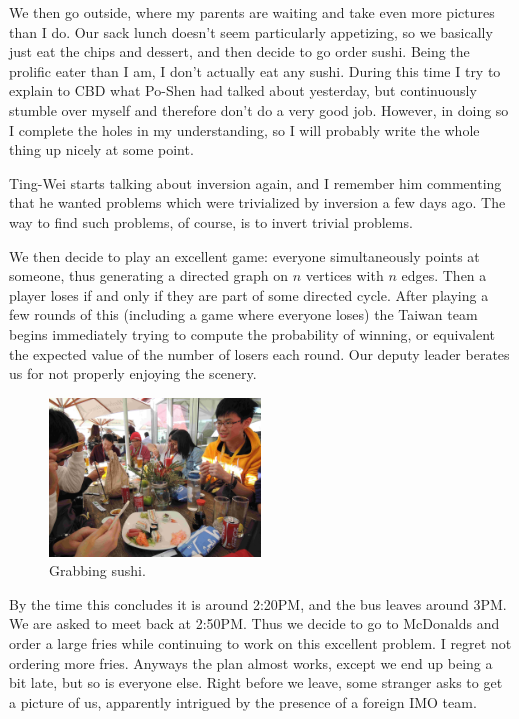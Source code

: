 \documentclass[11pt]{scrreprt}
\numberwithin{figure}{chapter}
\begin{document}
We then go outside, where my parents are waiting and take even more pictures than I do.
Our sack lunch doesn't seem particularly appetizing, so we basically just eat the chips and dessert,
and then decide to go order sushi. Being the prolific eater than I am, I don't actually eat any sushi.
During this time I try to explain to CBD what Po-Shen had talked about yesterday, but continuously
stumble over myself and therefore don't do a very good job.
However, in doing so I complete the holes in my understanding,
so I will probably write the whole thing up nicely at some point.

Ting-Wei starts talking about inversion again, and I remember him commenting that he wanted problems
which were trivialized by inversion a few days ago. The way to find such problems, of course, is to
invert trivial problems.

We then decide to play an excellent game: everyone simultaneously points at someone, thus generating
a directed graph on $n$ vertices with $n$ edges. Then a player loses if and only if they are part
of some directed cycle.
After playing a few rounds of this (including a game where everyone loses) the Taiwan team begins
immediately trying to compute the probability of winning, or equivalent the expected value of the
number of losers each round. Our deputy leader berates us for not properly enjoying the scenery.

\begin{figure}[ht]
  \centering
  \includegraphics[width=0.5\textwidth]{media/sushi.jpg}
  \caption{Grabbing sushi.}
\end{figure}

By the time this concludes it is around 2:20PM, and the bus leaves around 3PM.
We are asked to meet back at 2:50PM.
Thus we decide to go to McDonalds and order a large fries while continuing to work on this excellent problem.
I regret not ordering more fries.
Anyways the plan almost works, except we end up being a bit late, but so is everyone else.
Right before we leave, some stranger asks to get a picture of us, apparently intrigued by
the presence of a foreign IMO team.
\end{document}
